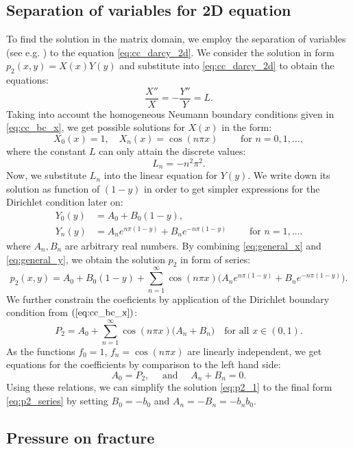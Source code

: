 \documentclass[sn-mathphys,Numbered]{sn-jnl}
\begin{document}
\subsection{\bf Separation of variables for 2D equation}
\label{sec:p2_conductive}
%
To find the solution in the matrix domain, we employ the separation of variables  (see e.g. \cite{Evans1998}) to the equation \eqref{eq:cc_darcy_2d}.  
We consider the solution in form $p_2(x,y) = X(x)Y(y)$ 
and substitute into \eqref{eq:cc_darcy_2d} to obtain the equations:
\[
\frac{X''}{X} = -\frac{Y''}{Y} = L.
\]  
Taking into account the homogeneous Neumann boundary conditions given in \eqref{eq:cc_bc_x}, we get possible solutions for $X(x)$ in the form:
\begin{equation}
    \label{eq:general_x}
    X_0(x) = 1, \quad X_n(x) = \cos (n\pi x)\qquad \text{ for }n=0,1, \dots,
\end{equation}
where the constant $L$ can only attain the discrete values:
\[
    L_n= - n^2 \pi^2.
\]
Now, we substitute $L_n$ into the linear equation for $Y(y)$. We write down its solution as function of $(1-y)$ in order to get simpler expressions for the Dirichlet condition later on:
\begin{align}
Y_0(y) &= A_0 + B_0 (1-y), \nonumber \\
\label{eq:general_y}
Y_n(y) &= A_n e^{n\pi (1-y)}+ B_n e^{-n\pi (1-y)}\qquad \text{ for } n =1, \dots.
\end{align}
where $A_n, B_n$ are arbitrary real numbers.
%
By combining \eqref{eq:general_x} and \eqref{eq:general_y}, we obtain the solution $p_2$ in form of series:
\begin{equation}
    \label{eq:p2_1}
    p_2(x, y) = A_0 + B_0 (1-y) + \sum ^{\infty}_{n=1} \cos (n\pi x) 
            \big(A_n e^{n\pi (1-y)} + B_n e^{-n\pi (1-y)}\big).
\end{equation}
We further constrain the coeficients by application of the  Dirichlet boundary condition from $(\ref{eq:cc_bc_x})$:
\[
    P_2 = A_0  + \sum ^{\infty}_{n=1} \cos (n\pi x) 
            \big(A_n  + B_n\big)\quad \text{for all }x\in (0, 1).
\]
As the functions $f_0=1$, $f_n =\cos(n\pi x)$ are linearly independent, we get equations for the coefficients by comparison to the left hand side: 
\[
    A_0  = P_2, \quad\text{ and } \quad A_n+B_n = 0.
\]
Using these relations, we can simplify the solution \eqref{eq:p2_1} to the final form \eqref{eq:p2_series} by setting $B_0= -b_0$ and $A_n=-B_n = -b_nb_0$.


\subsection{Pressure on fracture}
\label{sec:p1_conductive}
\end{document}
